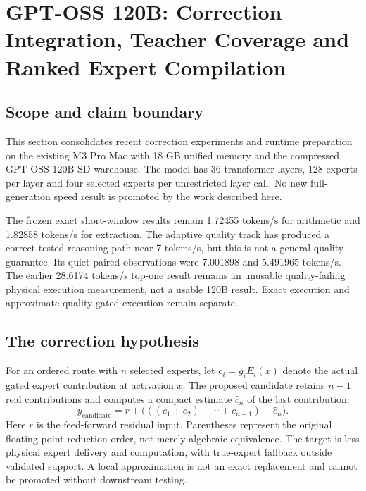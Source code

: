 \section{GPT-OSS 120B: Correction Integration, Teacher Coverage and Ranked Expert Compilation}
\label{sec:gptoss-ranked-correction-20260912}

\subsection{Scope and claim boundary}
This section consolidates recent correction experiments and runtime preparation
on the existing M3 Pro Mac with 18 GB unified memory and the compressed
GPT-OSS 120B SD warehouse. The model has 36 transformer layers, 128 experts
per layer and four selected experts per unrestricted layer call. No new
full-generation speed result is promoted by the work described here.

The frozen exact short-window results remain 1.72455 tokens/s for arithmetic
and 1.82858 tokens/s for extraction. The adaptive quality track has produced
a correct tested reasoning path near 7 tokens/s, but this is not a general
quality guarantee. Its quiet paired observations were 7.001898 and 5.491965
tokens/s. The earlier 28.6174 tokens/s top-one result remains an unusable
quality-failing physical execution measurement, not a usable 120B result.
Exact execution and approximate quality-gated execution remain separate.

\subsection{The correction hypothesis}
For an ordered route with $n$ selected experts, let $c_i=g_iE_i(x)$ denote
the actual gated expert contribution at activation $x$. The proposed
candidate retains $n-1$ real contributions and computes a compact estimate
$\widehat c_n$ of the last contribution:
\[
 y_{\mathrm{candidate}}=r+
 \bigl(((c_1+c_2)+\cdots+c_{n-1})+\widehat c_n\bigr).
\]
Here $r$ is the feed-forward residual input. Parentheses represent the
original floating-point reduction order, not merely algebraic equivalence.
The target is less physical expert delivery and computation, with true-expert
fallback outside validated support. A local approximation is not an exact
replacement and cannot be promoted without downstream testing.

